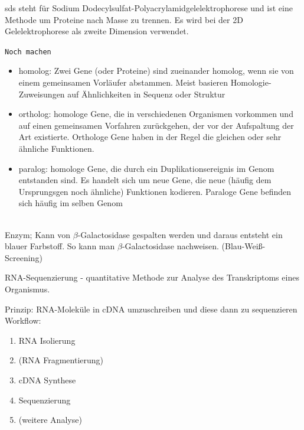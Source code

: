 \gls{sds} steht für Sodium Dodecylsulfat-Polyacrylamidgelelektrophorese und ist eine Methode um Proteine nach Masse zu trennen. Es wird bei der 2D Gelelektrophorese als zweite Dimension verwendet. \\ \newline

\texttt{Noch machen} %
\\ \newline

\begin{itemize}
    \item homolog: Zwei Gene (oder Proteine) sind zueinander homolog, wenn sie von einem gemeinsamen Vorläufer abstammen.
Meist basieren Homologie-Zuweisungen auf Ähnlichkeiten in Sequenz oder Struktur
\item ortholog: homologe Gene, die in verschiedenen Organismen vorkommen und auf einen gemeinsamen Vorfahren
zurückgehen, der vor der Aufspaltung der Art existierte. Orthologe Gene haben in der Regel die gleichen oder sehr ähnliche Funktionen.
\item paralog: homologe Gene, die durch ein Duplikationsereignis im Genom entstanden sind. Es handelt sich um neue Gene, die neue (häufig dem Ursprungsgen noch ähnliche) Funktionen kodieren. Paraloge Gene befinden sich häufig im selben Genom
\end{itemize} $\ $ \\

Enzym; Kann von $\beta$-Galactosidase gespalten werden und daraus entsteht ein blauer Farbstoff. So kann man $\beta$-Galactosidase nachweisen. (Blau-Weiß-Screening) \\ \newline

RNA-Sequenzierung - quantitative Methode zur Analyse des Transkriptoms eines Organismus. \\ \newline

Prinzip: RNA-Moleküle in cDNA umzuschreiben und diese dann zu sequenzieren  \\
Workflow: 
\begin{enumerate}
    \item RNA Isolierung
    \item (RNA Fragmentierung)
    \item cDNA Synthese
    \item Sequenzierung
    \item (weitere Analyse)
\end{enumerate} $\ $ \\

